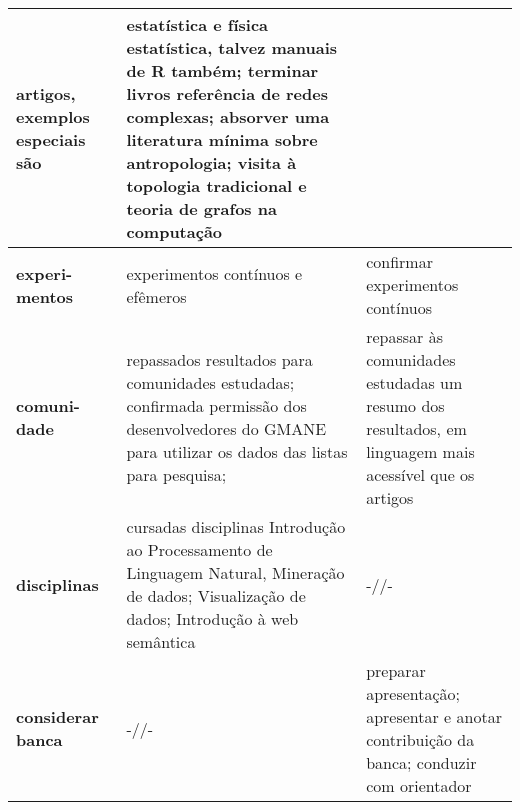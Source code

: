 \documentclass[a4paper,openright,12pt]{report} %
\begin{document}
\begin{table}[!h]
\begin{tabular}{p{1.3cm}||p{7.6cm}|p{7.1cm}}
		       artigos, exemplos especiais são~\cite{} & 
		                       estatística e física estatística, talvez manuais de R também;
				       terminar livros referência de redes complexas;
				       absorver uma literatura mínima sobre antropologia;
				       visita à topologia tradicional e teoria de grafos na computação \\\hline\hline
				       {\bf experi-mentos} & experimentos contínuos e efêmeros  & confirmar experimentos contínuos \\\hline
				       {\bf comuni-dade  }& repassados resultados para comunidades estudadas;
				       confirmada permissão dos desenvolvedores
				      do GMANE para utilizar os dados das listas para pesquisa;
				        & repassar às comunidades estudadas um resumo dos resultados, em linguagem mais acessível que os artigos \\\hline
				      {\bf disciplinas} & cursadas disciplinas Introdução ao Processamento de Linguagem Natural,
				       Mineração de dados;
				       Visualização de dados;
				       Introdução à web semântica & -//- \\\hline
				       {\bf considerar banca} & -//-  & preparar apresentação; apresentar e anotar contribuição da banca; conduzir com orientador \\\hline
\end{tabular}
\end{table}
\end{document}
